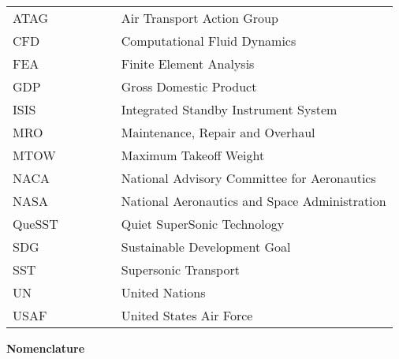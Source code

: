 \documentclass[a4paper,11pt]{article}
\begin{document}
\noindent
\begin{tabular}{llllll} %
\vspace{0.75em}
ATAG &&&&& Air Transport Action Group\\
\vspace{0.75em}
CFD &&&&& Computational Fluid Dynamics\\
\vspace{0.75em}
FEA &&&&& Finite Element Analysis\\
\vspace{0.75em}
GDP &&&&& Gross Domestic Product\\
\vspace{0.75em}
ISIS &&&&& Integrated Standby Instrument System\\
\vspace{0.75em}
MRO &&&&& Maintenance, Repair and Overhaul\\
\vspace{0.75em}
MTOW &&&&& Maximum Takeoff Weight\\
\vspace{0.75em}
NACA &&&&& National Advisory Committee for Aeronautics\\
\vspace{0.75em}
NASA &&&&& National Aeronautics and Space Administration\\
\vspace{0.75em}
QueSST &&&&& Quiet SuperSonic Technology\\
\vspace{0.75em}
SDG &&&&& Sustainable Development Goal\\
\vspace{0.75em}
SST &&&&& Supersonic Transport\\
\vspace{0.75em}
UN &&&&& United Nations\\
\vspace{0.75em}
USAF &&&&& United States Air Force\\
\end{tabular}

\vspace{2cm}


\noindent\begin{Large}\textbf{Nomenclature}\end{Large}\\ \\
\end{document}
